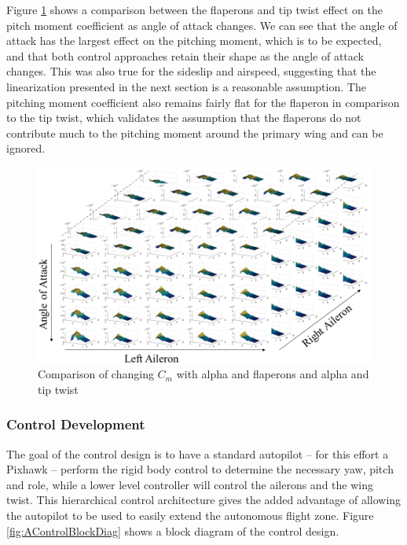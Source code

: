 \documentclass[11pt]{ucthesis}
\begin{document}
Figure \ref{fig:ADataCube} shows a comparison between the flaperons and tip twist effect on the pitch moment coefficient as angle of attack changes. We can see that the angle of attack has the largest effect on the pitching moment, which is to be expected, and that both control approaches retain their shape as the angle of attack changes. This was also true for the sideslip and airspeed, suggesting that the linearization presented in the next section is a reasonable assumption. The pitching moment coefficient also remains fairly flat for the flaperon in comparison to the tip twist, which validates the assumption that the flaperons do not contribute much to the pitching moment around the primary wing and can be ignored.

\begin{figure}[h]
\centering
\includegraphics[width=1\linewidth]{Figures/DataCube.png}
\caption{Comparison of changing $C_m$ with alpha and flaperons and alpha and tip twist}
\label{fig:ADataCube}
\end{figure}

\subsubsection{Control Development}
The goal of the control design is to have a standard autopilot – for this effort a Pixhawk – perform the rigid body control to determine the necessary yaw, pitch and role, while a lower level controller will control the ailerons and the wing twist. This hierarchical control architecture gives the added advantage of allowing the autopilot to be used to easily extend the autonomous flight zone. Figure \ref{fig:AControlBlockDiag} shows a block diagram of the control design.
\end{document}
